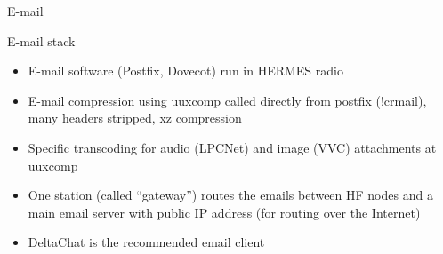 \documentclass[aspectratio=169,xcolor={x11names,svgnames,dvipsnames}]{beamer}
\begin{document}
\begin{frame}{E-mail}

\begin{block}{E-mail stack}
  \begin{itemize}
  \item E-mail software (Postfix, Dovecot) run in HERMES radio
  \item E-mail compression using uuxcomp called directly from postfix (!crmail), many headers stripped, xz compression
  \item Specific transcoding for audio (LPCNet) and image (VVC) attachments at uuxcomp
  \item One station (called ``gateway'') routes the emails between HF nodes and a main email server with public IP address (for routing over the Internet)
  \item DeltaChat is the recommended email client
  \end{itemize}
\end{block}

\vspace{-0.15cm}
\begin{center}

\end{center}



\end{frame}
\end{document}
